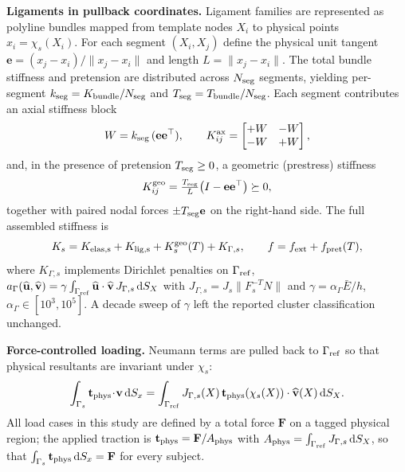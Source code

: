 \documentclass[11pt]{article}
\begin{document}
\noindent\textbf{Ligaments in pullback coordinates.}
Ligament families are represented as polyline bundles mapped from template nodes $X_i$ to physical points $x_i=\chi_s(X_i)$.
For each segment $(X_i,X_j)$ define the physical unit tangent $\mathbf e=(x_j-x_i)/\|x_j-x_i\|$ and length $L=\|x_j-x_i\|$.
The total bundle stiffness and pretension are distributed across $N_{\rm seg}$ segments, yielding per-segment $k_{\rm seg}=K_{\rm bundle}/N_{\rm seg}$ and $T_{\rm seg}=T_{\rm bundle}/N_{\rm seg}$.
Each segment contributes an axial stiffness block
\begin{equation}
W=k_{\rm seg}\,(\mathbf e\mathbf e^\top),\qquad
K^{\rm ax}_{ij}=\begin{bmatrix} +W & -W\\ -W & +W\end{bmatrix},
\end{equation}
and, in the presence of pretension $T_{\rm seg}\ge 0$, a geometric (prestress) stiffness
\begin{equation}
K^{\rm geo}_{ij}=\tfrac{T_{\rm seg}}{L}\big(I-\mathbf e\mathbf e^\top\big)\succeq 0,
\label{eq:kgeo}
\end{equation}
together with paired nodal forces $\pm T_{\rm seg}\mathbf e$ on the right-hand side.
The full assembled stiffness is
\begin{equation}
K_s=K_{\rm elas,s}+K_{\rm lig,s}+K^{\rm geo}_s(T)+K_{\Gamma,s},\qquad
f=f_{\rm ext}+f_{\rm pret}(T),
\label{eq:K-assembled}
\end{equation}
where $K_{\Gamma,s}$ implements Dirichlet penalties on $\Gamma_{\rm ref}$,
$a_\Gamma(\widehat{\mathbf u},\widehat{\mathbf v})=\gamma\int_{\Gamma_{\rm ref}} \widehat{\mathbf u}\cdot\widehat{\mathbf v}\,J_{\Gamma,s}\,\mathrm dS_X$ with $J_{\Gamma,s}=J_s\|F_s^{-T}N\|$ and $\gamma=\alpha_\Gamma\bar E/h$, $\alpha_\Gamma\in[10^3,10^5]$.
A decade sweep of $\gamma$ left the reported cluster classification unchanged.

\noindent\textbf{Force-controlled loading.}
Neumann terms are pulled back to $\Gamma_{\rm ref}$ so that physical resultants are invariant under $\chi_s$:
\begin{equation}
\int_{\Gamma_s}\mathbf t_{\rm phys}\!\cdot\!\mathbf v\,\mathrm dS_x
=\int_{\Gamma_{\rm ref}} J_{\Gamma,s}(X)\,\mathbf t_{\rm phys}(\chi_s(X))\cdot\widehat{\mathbf v}(X)\,\mathrm dS_X.
\label{eq:neumann-pullback}
\end{equation}
All load cases in this study are defined by a total force $\mathbf F$ on a tagged physical region; the applied traction is $\mathbf t_{\rm phys}=\mathbf F/A_{\rm phys}$ with $A_{\rm phys}=\int_{\Gamma_{\rm ref}}J_{\Gamma,s}\,\mathrm dS_X$, so that $\int_{\Gamma_s}\mathbf t_{\rm phys}\,\mathrm dS_x=\mathbf F$ for every subject.
\end{document}

